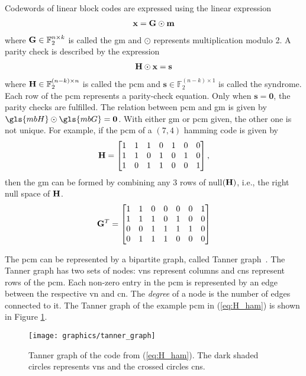 Codewords of linear block codes are expressed using the linear expression \begin{align}\mathbf{x}=\mathbf{G}\odot\mathbf{m}\end{align} where $\mathbf{G}\in\mathbb{F}_2^{n\times k}$ is called the \gls{gm} and $\odot$ represents multiplication modulo 2. A parity check is described by the expression \begin{align}\mathbf{H}\odot\mathbf{x}=\mathbf{s}\end{align} where $\mathbf{H}\in\mathbb{F}_2^{(n-k)\times n}$ is called the \gls{pcm} and $\mathbf{s}\in\mathbb{F}_2^{(n-k)\times 1}$ is called the syndrome. Each row of the \gls{pcm} represents a parity-check equation. Only when $\mathbf{s}=\mathbf{0}$, the parity checks are fulfilled. The relation between \gls{pcm} and \gls{gm} is given by $\gls{mbH}\odot\gls{mbG}=\mathbf{0}$. With either \gls{gm} or \gls{pcm} given, the other one is not unique. For example, if the \gls{pcm} of a $(7,4)$ hamming code is given by
\begin{align} \label{eq:H_ham}
\mathbf{H} =
\begin{bmatrix}
1 &1 &1 &0 &1 &0 &0 \\
1 &1 &0 &1 &0 &1 &0 \\
1 &0 &1 &1 &0 &0 &1
\end{bmatrix},
\end{align}
then the \gls{gm} can be formed by combining any 3 rows of null$(\mathbf{H})$, i.e., the right null space of $\mathbf{H}$.
\begin{align} \label{eq:G_ham}
\mathbf{G}^T =
\begin{bmatrix}
1 &1 &0 &0 &0 &0 &1 \\
1 &1 &1 &0 &1 &0 &0 \\
0 &0 &1 &1 &1 &1 &0 \\
0 &1 &1 &1 &0 &0 &0
\end{bmatrix}
\end{align}

The \gls{pcm} can be represented by a bipartite graph, called Tanner graph~\cite{Tanner1981}. The Tanner graph has two sets of nodes: \glspl{vn} represent columns and \glspl{cn} represent rows of the \gls{pcm}. Each non-zero entry in the \gls{pcm} is represented by an edge between the respective \gls{vn} and \gls{cn}. The \emph{degree} of a node is the number of edges connected to it. The Tanner graph of the example \gls{pcm} in (\ref{eq:H_ham}) is shown in Figure \ref{fig:tannGraph}.

\begin{figure}[htbp]
  \centering
  \texttt{[image: graphics/tanner\_graph]}
  \caption{Tanner graph of the code from (\ref{eq:H_ham}). The dark shaded circles represents \glspl{vn} and the crossed circles \glspl{cn}.}
  \label{fig:tannGraph}
\end{figure}

